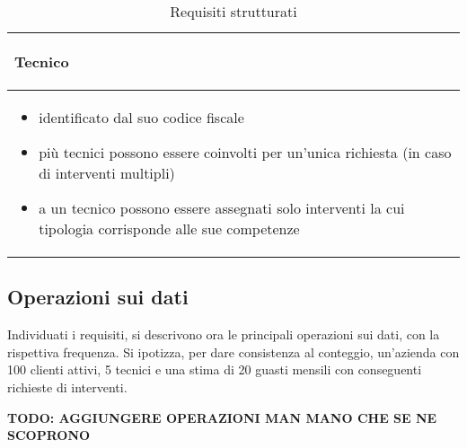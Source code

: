 \documentclass{article}
\begin{document}
\begin{table}[h]
\begin{tabular}{|m{17cm}|}
        \hline
        \begin{center}\textbf{Tecnico}\end{center} \\
        \hline
        \begin{itemize}
            \item identificato dal suo codice fiscale
            \item più tecnici possono essere coinvolti per un'unica richiesta (in caso di interventi multipli)
            \item a un tecnico possono essere assegnati solo interventi la cui tipologia corrisponde alle sue competenze 
        \end{itemize} \\
        \hline
    \end{tabular}
    \caption{Requisiti strutturati}
    \label{tab:op_freq}
\end{table}

\newpage

\subsection{Operazioni sui dati}

Individuati i requisiti, si descrivono ora le principali operazioni sui dati, con la rispettiva frequenza.
Si ipotizza, per dare consistenza al conteggio, un'azienda con 100 clienti attivi, 5 tecnici e una stima di 20 guasti mensili con conseguenti richieste di interventi.

\textbf{TODO: AGGIUNGERE OPERAZIONI MAN MANO CHE SE NE SCOPRONO}
\end{document}
